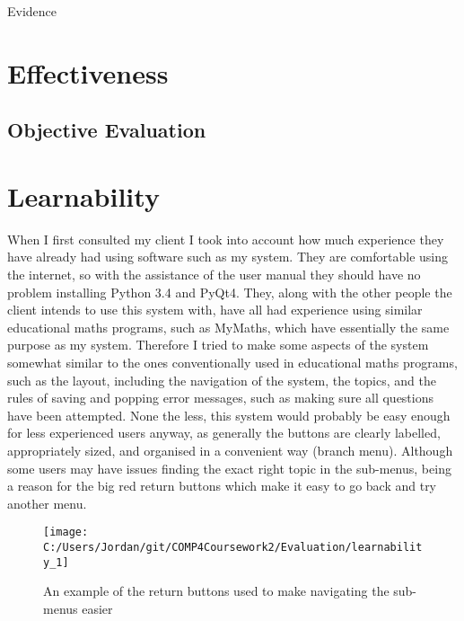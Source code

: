 Evidence
















 
\section{Effectiveness}

\subsection{Objective Evaluation}






\section{Learnability}

When I first consulted my client I took into account how much experience they have already had using software such as my system. They are comfortable using the internet, so with the assistance of the user manual they should have no problem installing Python 3.4 and PyQt4. They, along with the other people the client intends to use this system with, have all had experience using similar educational maths programs, such as MyMaths, which have essentially the same purpose as my system. Therefore I tried to make some aspects of the system somewhat similar to the ones conventionally used in educational maths programs, such as the layout, including the navigation of the system, the topics, and the rules of saving and popping error messages, such as making sure all questions have been attempted. None the less, this system would probably be easy enough for less experienced users anyway, as generally the buttons are clearly labelled, appropriately sized, and organised in a convenient way (branch menu). Although some users may have issues finding the exact right topic in the sub-menus, being a reason for the big red return buttons which make it easy to go back and try another menu.

\begin{figure}[H]
	\texttt{[image: C:/Users/Jordan/git/COMP4Coursework2/Evaluation/learnability\_1]}
	\caption{An example of the return buttons used to make navigating the sub-menus easier}
\end{figure}

